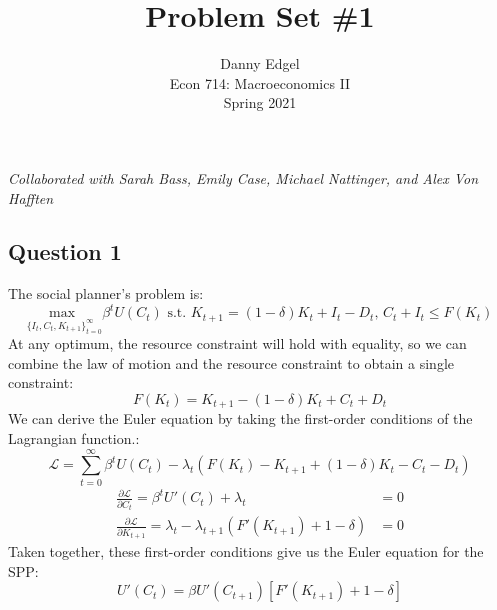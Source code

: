 \documentclass{article}
\newcommand{\usmax}[1]{\underset{#1}{\text{max }}}
\renewcommand{\L}{\mathcal{L}}
\begin{document}
\title{	Problem Set \#1 }
\author{ 	Danny Edgel 					\\ 
			Econ 714: Macroeconomics II		\\
			Spring 2021						\\
		}
\maketitle\thispagestyle{empty}


\noindent\textit{Collaborated with Sarah Bass, Emily Case, Michael Nattinger, and Alex Von Hafften}


\subsection*{Question 1}

The social planner's problem is:
\[
	\usmax{\{I_t,C_t,K_{t+1}\}_{t=0}^\infty}\beta^tU(C_t)\text{ s.t. }K_{t+1} = (1-\delta)K_t + I_t - D_t\text{, } C_t + I_t\leq F(K_t)
\]
At any optimum, the resource constraint will hold with equality, so we can combine the law of motion and the resource constraint to obtain a single constraint:
\[
	F(K_t) = K_{t+1} - (1-\delta)K_t + C_t + D_t 
\]
We can derive the Euler equation by taking the first-order conditions of the Lagrangian function.:
\[
	\L = \sum_{t=0}^\infty \beta^tU(C_t) - \lambda_t\left(F(K_t) - K_{t+1} + (1-\delta)K_t - C_t - D_t \right)
\]
\begin{align*}
	\frac{\partial \L}{\partial C_t} 		= \beta^tU'(C_t)+\lambda_t 										&= 0	\\
	\frac{\partial \L}{\partial K_{t+1}}	= \lambda_t - \lambda_{t+1}\left(F'(K_{t+1}) + 1-\delta\right) 	&= 0	
\end{align*}
Taken together, these first-order conditions give us the Euler equation for the SPP:
\[
	U'(C_t) = \beta U'(C_{t+1})\left[F'(K_{t+1})+1-\delta\right]
\]


\pagebreak
\end{document}

